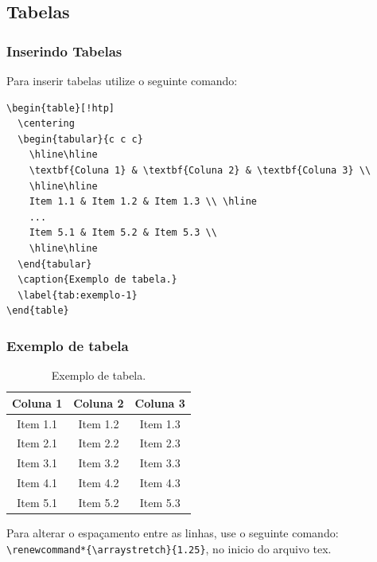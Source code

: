 \documentclass[compress]{beamer}
\renewcommand*{\arraystretch}{1.25}
\begin{document}

\subsection{Tabelas}



\begin{frame}[fragile]
  \frametitle{Inserindo Tabelas}

  Para inserir tabelas utilize o seguinte comando:

\begin{lstlisting}
\begin{table}[!htp]
  \centering
  \begin{tabular}{c c c}
    \hline\hline
    \textbf{Coluna 1} & \textbf{Coluna 2} & \textbf{Coluna 3} \\
    \hline\hline
    Item 1.1 & Item 1.2 & Item 1.3 \\ \hline
    ... 
    Item 5.1 & Item 5.2 & Item 5.3 \\
    \hline\hline
  \end{tabular}
  \caption{Exemplo de tabela.}
  \label{tab:exemplo-1}
\end{table}
\end{lstlisting}

\end{frame}

\begin{frame}[fragile]
  \frametitle{Exemplo de tabela}
  
  
  \begin{table}[!htp]
    \centering
    \begin{tabular}{c c c}
      \hline\hline
      \textbf{Coluna 1} & \textbf{Coluna 2} & \textbf{Coluna 3} \\
      \hline\hline
      Item 1.1 & Item 1.2 & Item 1.3 \\ \hline
      Item 2.1 & Item 2.2 & Item 2.3 \\ \hline
      Item 3.1 & Item 3.2 & Item 3.3 \\ \hline
      Item 4.1 & Item 4.2 & Item 4.3 \\ \hline
      Item 5.1 & Item 5.2 & Item 5.3 \\
      \hline\hline
    \end{tabular}
    \caption{Exemplo de tabela.}
    \label{tab:exemplo-1}
  \end{table}

  Para alterar o espaçamento entre as linhas, use o seguinte comando: \lstinline|\renewcommand*{\arraystretch}{1.25}|, no inicio do arquivo tex.

\end{frame}
\end{document}
